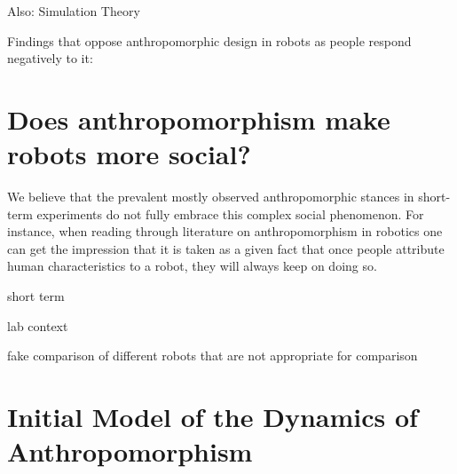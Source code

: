 \documentclass[twocolumn]{svjour3}          %
\begin{document}
	Also: Simulation Theory

	Findings that oppose anthropomorphic design in robots as people respond negatively to it:
	
	
%
%
%
%
%
%

\section{Does anthropomorphism make robots more social?}
\label{sec:6}

We believe that the prevalent mostly observed anthropomorphic stances in short-term experiments do not fully embrace this complex social phenomenon. For instance, when reading through literature on anthropomorphism in robotics one can get the impression that it is taken as a given fact that once people attribute human characteristics to a robot, they will always keep on doing so.
	
	short term
	
	lab context
	
	fake comparison of different robots that are not appropriate for comparison	
	
	
%
%
%
%
%
%

\section{Initial Model of the Dynamics of Anthropomorphism}
\label{sec:7}	
\end{document}
